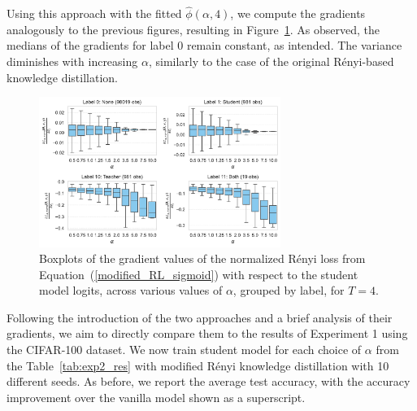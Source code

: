 Using this approach with the fitted $\hat{\phi}(\alpha,4)$, we compute the gradients analogously to the previous figures, resulting in Figure~\ref{fig:gradients_boxplot_sigmoid}. As observed, the medians of the gradients for label 0 remain constant, as intended. The variance diminishes with increasing $\alpha$, similarly to the case of the original Rényi-based knowledge distillation.

\begin{figure}[h!]
	\centering
	\includegraphics[width=0.7\textwidth]{../img/gradients_boxplot_sigmoid.pdf}
	\caption{Boxplots of the gradient values of the normalized Rényi loss from Equation~(\ref{modified_RL_sigmoid}) with respect to the student model logits, across various values of $\alpha$, grouped by label, for $T=4$.}
	\label{fig:gradients_boxplot_sigmoid}
\end{figure}

Following the introduction of the two approaches and a brief analysis of their gradients, we aim to directly compare them to the results of Experiment 1 using the CIFAR-100 dataset. We now train student model for each choice of $\alpha$ from the Table~\ref{tab:exp2_res} with modified Rényi knowledge distillation with 10 different seeds. As before, we report the average test accuracy, with the accuracy improvement over the vanilla model shown as a superscript.

